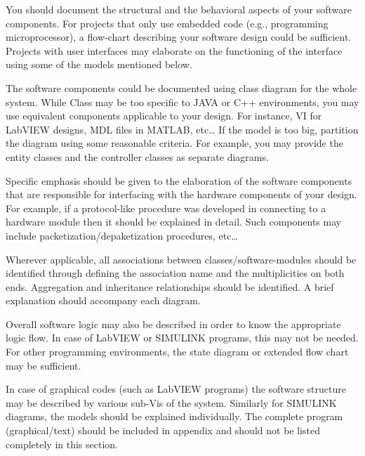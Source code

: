 \documentclass[../main.tex]{subfiles}
\begin{document}
\begin{newrequirements}
    \begin{todolist}
    \item You should document the structural and 
        the behavioral aspects of your software 
        components. For projects that only use 
        embedded code (e.g., programming 
        microprocessor), a flow-chart 
        describing your software design could 
        be sufficient. Projects with user 
        interfaces may elaborate on the 
        functioning of the interface using some 
        of the models mentioned below. 

    \item The software components could be 
        documented using class diagram for the 
        whole system. While Class may be too 
        specific to JAVA or C++ environments, 
        you may use equivalent components 
        applicable to your design. For 
        instance, VI for LabVIEW designs, MDL 
        files in MATLAB, etc… If the model is 
        too big, partition the diagram using 
        some reasonable criteria.  For example, 
        you may provide the entity classes and 
        the controller classes as separate 
        diagrams. 

    \item Specific emphasis should be given to 
        the elaboration of the software 
        components that are responsible for 
        interfacing with the hardware 
        components of your design. For example, 
        if a protocol-like procedure was 
        developed in connecting to a hardware 
        module then it should be explained in 
        detail. Such components may include 
        packetization/depaketization 
        procedures, etc… 

    \item Wherever applicable, all associations 
        between classes/software-modules should 
        be identified through defining the 
        association name and the multiplicities 
        on both ends. Aggregation and 
        inheritance relationships should be 
        identified.  A brief explanation should 
        accompany each diagram. 

    \item Overall software logic may also be 
        described in order to know the 
        appropriate logic flow. In case of 
        LabVIEW or SIMULINK programs, this may 
        not be needed. For other programming 
        environments, the state diagram or 
        extended flow chart may be sufficient. 

    \item In case of graphical codes (such as 
        LabVIEW programs) the software 
        structure may be described by various 
        sub-Vis of the system. Similarly for 
        SIMULINK diagrams, the models should be 
        explained individually. The complete 
        program (graphical/text) should be 
        included in appendix and should not be 
        listed completely in this section. 
                
    \end{todolist}
\end{newrequirements}
\end{document}
